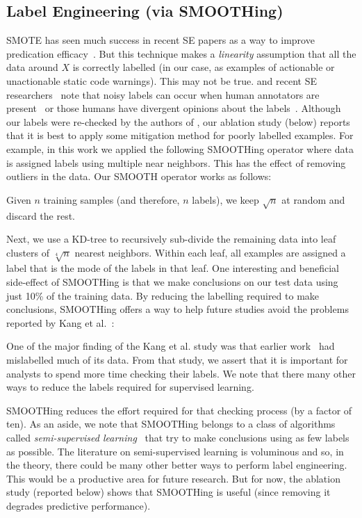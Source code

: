 \subsection{Label Engineering (via SMOOTHing)}

SMOTE has seen much success in recent SE papers as a way to improve predication efficacy~\cite{agrawal2018better}. 
But this technique makes a {\em linearity} assumption that all the data around $X$ is correctly labelled
(in our case, as examples of actionable or unactionable static code warnings).
This may not be true.
 \citet{cordeiro2020survey} and recent SE researchers~\cite{frugal, debtfree, 9064604, jitterbug} note that  noisy labels can occur when human annotators are present~\cite{mcnicol2005primer} or those humans  have divergent opinions about the labels~\cite{barkan2021reduce, ma2019blind}. Although our labels were re-checked by the authors of \citet{kang2022detecting}, our ablation study (below) reports that it is best to apply some
 mitigation method for 
 poorly labelled examples. For example, in this work we applied the following SMOOTHing   operator where data is assigned labels using multiple near neighbors. This has the effect of removing outliers in the data. 
 Our SMOOTH operator works as follows:
 \bi
 \item
 Given $n$ training samples (and therefore, $n$ labels), we keep $\sqrt{n}$ at random and discard the rest.
 \item
 Next, we use  a KD-tree to recursively sub-divide the remaining data into leaf clusters of   $\sqrt[4]{n}$ nearest neighbors. Within each leaf, all examples are assigned a label that is the  mode of the labels in that leaf.
 \ei
 One interesting and beneficial side-effect of SMOOTHing is that we   make conclusions on our test data using just 10\% of the training data. 
  By reducing  the labelling required to make conclusions, SMOOTHing
 offers a way to help future studies avoid the problems reported by Kang et al.~\cite{kang2022detecting}:
 \bi
 \item   One of the major finding of the Kang et al. study was that earlier work~\cite{yang2021learning}  had mislabelled much of its data. From that study, we assert that it is important for analysts to spend more time checking their labels.
 We note that there many other ways to reduce the labels required for supervised learning. 
 \item SMOOTHing reduces the effort required for that checking
 process (by a factor of ten).
 \ei
 As an aside, we note that SMOOTHing
 belongs to a class of algorithms
 called {\em semi-supervised learning}~\cite{frugal, debtfree}  that try to   make conclusions using as few labels as possible.
The literature on semi-supervised learning is voluminous \cite{berthelot2019mixmatch, fairssl, kingma2014semi,  zhai2019s4l, zhu2005semi} and so, in the theory, there could be many other better ways to perform label engineering.
This would be a productive area for future research.    But for now, the ablation
  study (reported below) shows that   SMOOTHing is useful
  (since removing it degrades predictive performance).
  

